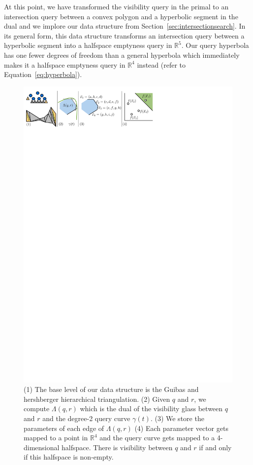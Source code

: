 \documentclass[a4paper, UKenglish]{lipics-v2018}
\begin{document}
At this point, we have transformed the visibility query in the primal to an intersection query between a convex polygon and a hyperbolic segment in the dual and we implore our data structure from Section~\ref{sec:intersectionsearch}. In its general form, this data structure transforms an intersection query between a hyperbolic segment into a halfspace emptyness query in $\mathbb{R}^5$. Our query hyperbola has one fewer degrees of freedom than a general hyperbola which immediately makes it a halfspace emptyness query in $\mathbb{R}^4$ instead (refer to Equation~\ref{eq:hyperbola}).


\begin{figure}[h]
    \centering
    \includegraphics[]{../panel}
    \caption{(1) The base level of our data structure is the Guibas and hershberger hierarchical triangulation. (2) Given $q$ and $r$, we compute $\Lambda(q,r)$ which is the dual of the visibility glass between $q$ and $r$ and the degree-2 query curve $\gamma(t)$. (3) We store the parameters of each edge of $\Lambda(q,r)$ (4) Each parameter vector gets mapped to a point in $\mathbb{R}^4$ and the query curve gets mapped to a 4-dimensional halfspace. There is visibility between $q$ and $r$ if and only if this halfspace is non-empty.}
    \label{fig:panel}
\end{figure}
\end{document}
